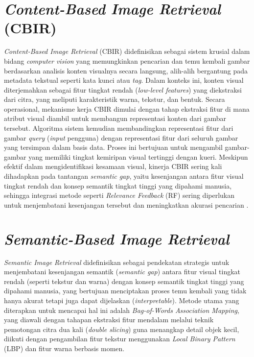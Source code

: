 \section{\textit{Content-Based Image Retrieval} (CBIR)}

\textit{Content-Based Image Retrieval} (CBIR) didefinisikan sebagai sistem krusial dalam bidang \textit{computer vision} yang memungkinkan pencarian dan temu kembali gambar berdasarkan analisis konten visualnya secara langsung, alih-alih bergantung pada metadata tekstual seperti kata kunci atau \textit{tag}. Dalam konteks ini, konten visual diterjemahkan sebagai fitur tingkat rendah (\textit{low-level features}) yang diekstraksi dari citra, yang meliputi karakteristik warna, tekstur, dan bentuk. Secara operasional, mekanisme kerja CBIR dimulai dengan tahap ekstraksi fitur di mana atribut visual diambil untuk membangun representasi konten dari gambar tersebut. Algoritma sistem kemudian membandingkan representasi fitur dari gambar \textit{query} (\textit{input} pengguna) dengan representasi fitur dari seluruh gambar yang tersimpan dalam basis data. Proses ini bertujuan untuk mengambil gambar-gambar yang memiliki tingkat kemiripan visual tertinggi dengan kueri. Meskipun efektif dalam mengidentifikasi kesamaan visual, kinerja CBIR sering kali dihadapkan pada tantangan \textit{semantic gap}, yaitu kesenjangan antara fitur visual tingkat rendah dan konsep semantik tingkat tinggi yang dipahami manusia, sehingga integrasi metode seperti \textit{Relevance Feedback} (RF) sering diperlukan untuk menjembatani kesenjangan tersebut dan meningkatkan akurasi pencarian \autocite{qazanfari2023}.

\section{\textit{Semantic-Based Image Retrieval}}

\textit{Semantic Image Retrieval} didefinisikan sebagai pendekatan strategis untuk menjembatani kesenjangan semantik (\textit{semantic gap}) antara fitur visual tingkat rendah (seperti tekstur dan warna) dengan konsep semantik tingkat tinggi yang dipahami manusia, yang bertujuan menciptakan proses temu kembali yang tidak hanya akurat tetapi juga dapat dijelaskan (\textit{interpretable}). Metode utama yang diterapkan untuk mencapai hal ini adalah \textit{Bag-of-Words Association Mapping}, yang diawali dengan tahapan ekstraksi fitur mendalam melalui teknik pemotongan citra dua kali (\textit{double slicing}) guna menangkap detail objek kecil, diikuti dengan pengambilan fitur tekstur menggunakan \textit{Local Binary Pattern} (LBP) dan fitur warna berbasis momen.

